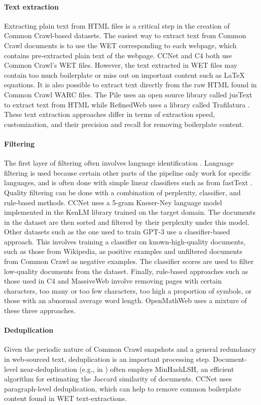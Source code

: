 \paragraph{Text extraction}
Extracting plain text from HTML files is a critical step in the creation of Common Crawl-based datasets. The easiest way to extract text from Common Crawl documents is to use the WET corresponding to each webpage, which contains pre-extracted plain text of the webpage. CCNet and C4 both use Common Crawl's WET files. However, the text extracted in WET files may contain too much boilerplate or miss out on important content such as \LaTeX{} equations. It is also possible to extract text directly from the raw HTML found in Common Crawl WARC files. The Pile uses an open source library called jusText \citep{justext} to extract text from HTML while RefinedWeb uses a library called Trafilatura \citep{barbaresi-2021-trafilatura}. These text extraction approaches differ in terms of extraction speed, customization, and their precision and recall for removing boilerplate content.

\paragraph{Filtering} 
The first layer of filtering often involves language identification \citep{wenzek2019ccnet}. Language filtering is used because certain other parts of the pipeline only work for specific languages, and is often done with simple linear classifiers such as from fastText \citep{joulin2016fasttext}. Quality filtering can be done with a combination of perplexity, classifier, and rule-based methods. CCNet uses a 5-gram Kneser-Ney language model implemented in the KenLM library \citep{heafield2011kenlm} trained on the target domain. The documents in the dataset are then sorted and filtered by their perplexity under this model. Other datasets such as the one used to train GPT-3 \citep{gpt3} use a classifier-based approach. This involves training a classifier on known-high-quality documents, such as those from Wikipedia, as positive examples and unfiltered documents from Common Crawl as negative examples. The classifier scores are used to filter low-quality documents from the dataset. Finally, rule-based approaches such as those used in C4 \citep{raffel2020exploring} and MassiveWeb \citep{gopher} involve removing pages with certain characters, too many or too few characters, too high a proportion of symbols, or those with an abnormal average word length. OpenMathWeb uses a mixture of these three approaches.

\paragraph{Deduplication} Given the periodic nature of Common Crawl snapshots and a general redundancy in web-sourced text, deduplication is an important processing step. Document-level near-deduplication (e.g., in \citep{gpt3, refined-web}) often employs MinHashLSH, an efficient algorithm for estimating the Jaccard similarity of documents. CCNet \citep{wenzek2019ccnet} uses paragraph-level deduplication, which can help to remove common boilerplate content found in WET text-extractions.